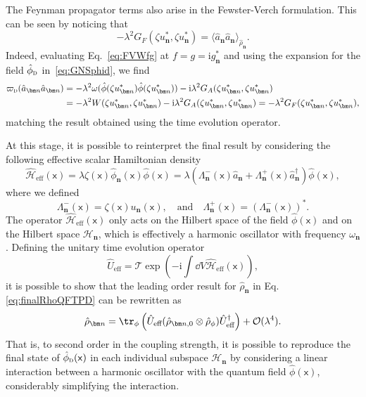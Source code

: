 \documentclass[letterpaper,12pt,titlepage,oneside,final]{book}
\newcommand{\mf}{\mathsf}%
\newcommand{\ii}{\mathrm{i}}
\renewcommand{\r}{\hat{\rho}}
\newcommand{\tc}[1]{\textsc{#1}}
\begin{document}
    The Feynman propagator terms also arise in the Fewster-Verch formulation. This can be seen by noticing that
    \begin{equation}
        -\lambda^2 G_F(\zeta u_{\bm n}^*, \zeta u_{\bm n}^*) = \langle\hat{a}_{\bm n} \hat{a}_{\bm n}\rangle_{\hat{\rho}_{\bm n}}.
    \end{equation}
    Indeed, evaluating Eq.~\eqref{eq:FVWfg} at $f = g = \ii g_{\bm n}^*$ and using the expansion for the field $\hat{\phi}_\tc{d}$ in~\eqref{eq:GNSphid}, we find
    \begin{align}
        \varpi_\tc{d}(\hat{a}_{\bm n} \hat{a}_{\bm n}) &= - \lambda^2 \omega(\hat{\phi}(\zeta u_{\bm n}^*)\hat{\phi}(\zeta u_{\bm n}^*)) - \ii \lambda^2 G_A(\zeta u_{\bm n}^*,\zeta u_{\bm n}^*)\\
        &= - \lambda^2 W(\zeta u_{\bm n}^*,\zeta u_{\bm n}^*) - \ii \lambda^2 G_A(\zeta u_{\bm n}^*,\zeta u_{\bm n}^*) = - \lambda^2 G_F(\zeta u_{\bm n}^*,\zeta u_{\bm n}^*),
    \end{align}
    matching the result obtained using the time evolution operator.
    
    At this stage, it is possible to reinterpret the final result by considering the following effective scalar Hamiltonian density
    \begin{equation}\label{eq:HeffFV}
        \hat{\mathcal{H}}_{\text{eff}}(\mf x) =
        \lambda \zeta(\mf x)\hat{\phi}_{\bm n}(\mf x) \hat{\phi}(\mf x) 
        = \lambda \!\left(\Lambda_{\bm n}^-(\mf x)\hat{a}_{\bm n}  +\Lambda_{\bm n}^+(\mf x) \hat{a}_{\bm n}^\dagger \right)\hat{\phi}(\mf x),
    \end{equation}
    where we defined 
    \begin{equation}
        \Lambda_{\bm n}^-(\mf x) = \zeta(\mf x) u_{{\bm n}}(\mf x), \quad \text{and} \quad \Lambda_{\bm n}^+(\mf x) = (\Lambda_{\bm n}^-(\mf x))^*.
    \end{equation}
    The operator $\hat{\mathcal{H}}_\text{eff}(\mf x)$ only acts on the Hilbert space of the field $\hat{\phi}(\mf x)$ and on the Hilbert space $\mathscr{H}_{{\bm n}}$, which is effectively a harmonic oscillator with frequency $\omega_{\bm n}$. Defining the unitary time evolution operator
    \begin{equation}
        \hat{U}_{\text{eff}} = \mathcal{T}\exp\left(- \ii \int \dd V \hat{\mathcal{H}}_{\text{eff}}(\mf x)\right),
    \end{equation}
    it is possible to show that the leading order result for $\r_{{\bm n}}$ in Eq. \eqref{eq:finalRhoQFTPD} can be rewritten as
    \begin{equation}
        \r_{{\bm n}} = \tr_\phi\left(\hat{U}_\text{eff}(\r_{{\bm n},0}\otimes \r_\phi )\hat{U}_{\text{eff}}^\dagger\right) + \mathcal{O}(\lambda^4).
    \end{equation}
    That is, to second order in the coupling strength, it is possible to reproduce the final state of $\hat{\phi}_\tc{d}(\mf x)$ in each individual subspace $\mathscr{H}_{{\bm n}}$ by considering a linear interaction between a harmonic oscillator with the quantum field $\hat{\phi}(\mf x)$, considerably simplifying the interaction.
\end{document}
